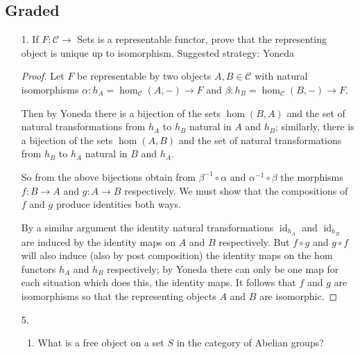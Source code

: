 \documentclass[11pt]{article}
\DeclareMathOperator{\id}{id}
\begin{document}
\subsection*{Graded}
\begin{enumerate}
    \item[1.] If $F\colon\mathcal{C}\to$ Sets is a representable functor, prove that the representing object is unique up to isomorphism. Suggested strategy: Yoneda \begin{proof}
        Let $F$ be representable by two objects $A, B\in \mathcal{C}$ with natural isomorphisms $\alpha\colon h_A = \hom_{\mathcal{C}}(A,-)\to F$ and $\beta\colon h_B = \hom_{\mathcal{C}}(B,-)\to F$.

        Then by Yoneda there is a bijection of the sets $\hom(B,A)$ and the set of natural transformations from $h_A$ to $h_B$ natural in $A$ and $h_B$; similarly, there is a bijection of the sets $\hom(A,B)$ and the set of natural transformations from $h_B$ to $h_A$ natural in $B$ and $h_A$.

        So from the above bijections obtain from $\beta^{-1}\circ \alpha$ and $\alpha^{-1}\circ \beta$ the morphisms $f\colon B\to A$ and $g\colon A\to B$ respectively. We must show that the compositions of $f$ and $g$ produce identities both ways.

        By a similar argument the identity natural transformations $\id_{h_A}$ and $\id_{h_B}$ are induced by the identity maps on $A$ and $B$ respectively. But $f\circ g$ and $g\circ f$ will also induce (also by post composition) the identity maps on the hom functors $h_A$ and $h_B$ respectively; by Yoneda there can only be one map for each situation which does this, the identity maps. It follows that $f$ and $g$ are isomorphisms so that the representing objects $A$ and $B$ are isomorphic.
    \end{proof} 
    \item[5.] \begin{enumerate}[label=(\roman*)]
        \item What is a free object on a set $S$ in the category of Abelian groups?
        

\end{enumerate}
\end{enumerate}
\end{document}
